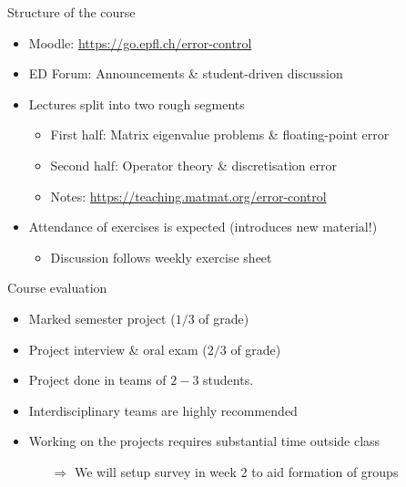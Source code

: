 \begin{frame}{Structure of the course}
    \begin{itemize}
        \item \alert{Moodle:} \url{https://go.epfl.ch/error-control}
        \vspace{-0.3em}
    \item \alert{ED Forum:} Announcements \& \alert{student-driven} discussion
        \vspace{1.0em}
        \item Lectures split into two rough segments
            \begin{itemize}
                \vspace{-0.3em}
                \item \alert{First half:} Matrix eigenvalue problems \& floating-point error
                \vspace{-0.3em}
                \item \alert{Second half:} Operator theory \& discretisation error
                \vspace{-0.3em}
                \item \alert{Notes:} \url{https://teaching.matmat.org/error-control}
            \end{itemize}
        \vspace{1.0em}
        \item Attendance of exercises is \alert{expected} \textcolor{grey5}{(introduces new material!)}
            \begin{itemize}
                \vspace{-0.3em}
                \item Discussion follows weekly exercise sheet
            \end{itemize}
    \end{itemize}
\end{frame}

\begin{frame}{Course evaluation}
    \begin{itemize}
        \item Marked semester project \textcolor{grey5}{($1/3$ of grade)}
        \item Project interview \& oral exam \textcolor{grey5}{($2/3$ of grade)}
        \item Project done in \alert{teams of $2-3$ students}.
        \item Interdisciplinary teams are highly recommended
        \vspace{1.5em}
        \item Working on the projects
            \alert{requires substantial time outside class}
            \begin{itemize}
                \vspace{-0.3em}
            \item[$\Rightarrow$] We will setup \alert{survey} in week 2 to \alert{aid formation of groups}
            \end{itemize}
    \end{itemize}
\end{frame}

